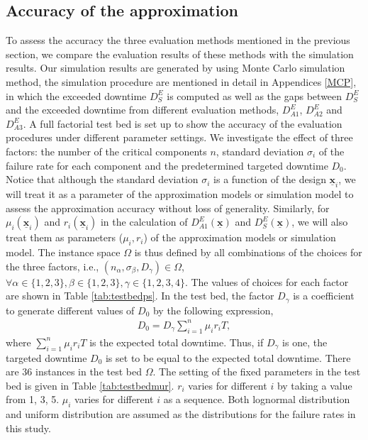 \documentclass[preprint,12pt]{elsarticle}
\begin{document}
\subsection{Accuracy of the approximation}
To assess the accuracy the three evaluation methods mentioned in the previous section, we compare the evaluation results of these methods with the simulation results. Our simulation results are generated by using Monte Carlo simulation method, the simulation procedure are mentioned in detail in Appendices \ref{MCP}, in which the exceeded downtime $D^{E}_{S}$ is computed as well as the gaps between $D^{E}_S$ and the exceeded downtime from different evaluation methods, $D^{E}_{A1}$, $D^{E}_{A2}$ and $D^{E}_{A3}$. A full factorial test bed is set up to show the accuracy of the evaluation procedures under different parameter settings. We investigate the effect of three factors: the number of the critical components $n$, standard deviation $\sigma_{i}$ of the failure rate for each component and the predetermined targeted downtime $D_{0}$. Notice that although the standard deviation $\sigma_{i}$ is a function of the design $\underline{\boldsymbol{x}}_{i}$, we will treat it as a parameter of the approximation models or simulation model to assess the approximation accuracy without loss of generality. Similarly, for $\mu_{i}(\underline{\boldsymbol{x}}_{i})$ and $r_{i}(\underline{\boldsymbol{x}}_{i})$ in the calculation of $D^{E}_{A1}(\underline{\boldsymbol{x}})$ and $D^{E}_{S}(\underline{\boldsymbol{x}})$, we will also treat them as parameters ($\mu_{i} , r_{i}$) of the approximation models or simulation model. The instance space $\Omega$ is thus defined by all combinations of the choices for the three factors, i.e., $(n_{\alpha},\sigma_{\beta},D_{\gamma}) \in \Omega$, $\forall \alpha \in \{1,2,3\}, \beta \in \{1,2,3\}, \gamma \in \{1,2,3,4\}$. The values of choices for each factor are shown in Table \ref{tab:testbedps}. In the test bed, the factor $D_{\gamma}$ is a coefficient to generate different values of $D_0$ by the following expression,
 \begin{eqnarray}
 D_{0} = D_{\gamma}\sum_{i=1}^{n}{\mu_{i} r_{i} T}, \label{D0}
\end{eqnarray}
where $\sum_{i=1}^{n}{\mu_{i} r_{i} T}$ is the expected total downtime. Thus, if $D_{\gamma}$ is one, the targeted downtime $D_0$ is set to be equal to the expected total downtime.
There are 36 instances in the test bed $\Omega$. The setting of the fixed parameters in the test bed is given in Table \ref{tab:testbedmur}. $r_{i}$ varies for different $i$ by taking a value from {1, 3, 5}. $\mu_{i}$ varies for different $i$ as a sequence. Both lognormal distribution and uniform distribution are assumed as the distributions for the failure rates in this study.
\end{document}
